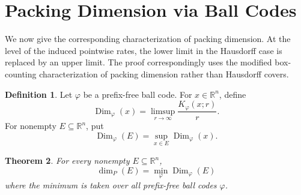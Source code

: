 \documentclass[a4paper,oneside,reqno,12pt]{amsart}
\theoremstyle{plain}
\newtheorem{theorem}{Theorem}[section]
\theoremstyle{definition}
\newtheorem{definition}[theorem]{Definition}
\theoremstyle{remark}
\DeclareMathOperator{\Dim}{Dim}
\begin{document}
\section{Packing Dimension via Ball Codes}
\label{sec:packing-ball-codes}

We now give the corresponding characterization of packing dimension.  At the
level of the induced pointwise rates, the lower limit in the Hausdorff case is
replaced by an upper limit.  The proof correspondingly uses the modified
box-counting characterization of packing dimension rather than Hausdorff
covers.

\begin{definition}
\label{def:packing-ball-code-dimension}
Let \(\varphi\) be a prefix-free ball code.  For \(x\in\mathbb R^n\), define
\[
\Dim_\varphi(x)
=
\limsup_{r\to\infty}
\frac{K_\varphi(x;r)}{r}.
\]
For nonempty \(E\subseteq\mathbb R^n\), put
\[
\Dim_\varphi(E)
=
\sup_{x\in E}\Dim_\varphi(x).
\]
\end{definition}



\begin{theorem}
\label{thm:packing-ball-code-dimension}
For every nonempty \(E\subseteq\mathbb R^n\),
\[
\dim_P(E)=\min_\varphi \Dim_\varphi(E)
\]
where the minimum is taken over all prefix-free ball codes \(\varphi\).
\end{theorem}
\end{document}
